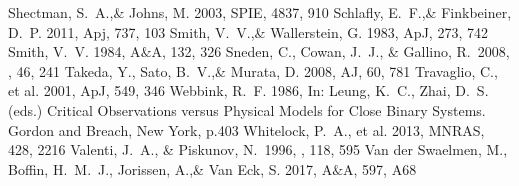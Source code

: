 \documentclass[a4paper,fleqn,usenatbib]{mnras}
\begin{document}
\begin{thebibliography}{99}
Shectman, S.~A.,\& Johns, M. 2003, 
SPIE, 4837, 910
Schlafly, E.~F.,\& Finkbeiner, D.~P. 2011, 
Apj, 737, 103
Smith, V.~V.,\& Wallerstein, G. 1983, 
ApJ, 273, 742
Smith, V.~V. 1984, 
A$\&$A, 132, 326
 Sneden, C., Cowan, J.~J., \& Gallino, R.\ 2008, \araa, 46, 241 
Takeda, Y., Sato, B.~V.,\& Murata, D. 2008, 
AJ, 60, 781
Travaglio, C., et al. 2001, 
ApJ, 549, 346
Webbink, R.~F. 1986, 
In: Leung, K.~C., Zhai, D.~S.(eds.) Critical Observations versus Physical Models for Close Binary Systems. Gordon and Breach, New York, p.403
Whitelock, P.~A., et al. 2013, 
MNRAS, 428, 2216
 Valenti, J.~A., \& Piskunov, N.\ 1996, \aaps, 118, 595 
Van der Swaelmen, M., Boffin, H.~M.~J., Jorissen, A.,\& Van Eck, S. 2017, 
A$\&$A, 597, A68






\end{thebibliography}


\bsp	%
\label{lastpage}
\end{document}

